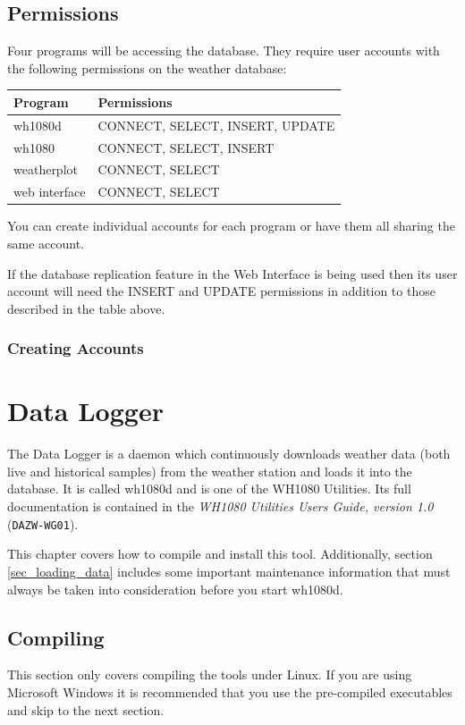 \documentclass[a4paper,10pt,draft]{book}
\begin{document}
\section{Permissions}
Four programs will be accessing the database. They require user accounts with the following permissions on the weather database:

\begin{tabular}{l l}
\hline
\textbf{Program} & \textbf{Permissions} \\
\hline
wh1080d & CONNECT, SELECT, INSERT, UPDATE \\
wh1080 & CONNECT, SELECT, INSERT \\
weatherplot & CONNECT, SELECT \\
web interface & CONNECT, SELECT \\
\hline
\end{tabular}

You can create individual accounts for each program or have them all sharing the same account.

If the database replication feature in the Web Interface is being used then its user account will need the INSERT and UPDATE permissions in addition to those described in the table above.

\subsection{Creating Accounts}

\chapter{Data Logger}

The Data Logger is a daemon which continuously downloads weather data (both live and historical samples) from the weather station and loads it into the database. It is called wh1080d and is one of the WH1080 Utilities. Its full documentation is contained in the \emph{WH1080 Utilities Users Guide, version 1.0} (\verb|DAZW-WG01|).

This chapter covers how to compile and install this tool. Additionally, section \ref{sec_loading_data} includes some important maintenance information that must always be taken into consideration before you start wh1080d.

\section{Compiling}
This section only covers compiling the tools under Linux. If you are using Microsoft Windows it is recommended that you use the pre-compiled executables and skip to the next section.
\end{document}
